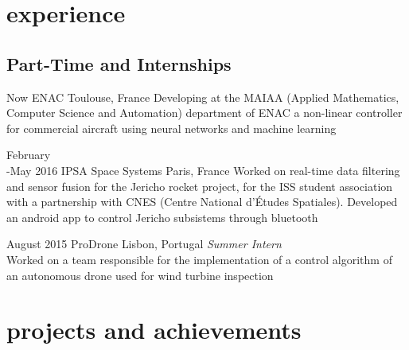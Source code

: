 \documentclass[a4paper]{friggeri-cv} %
\begin{document}

\section{experience}


\subsection{Part-Time and Internships}

\begin{entrylist}





\entry
{Now}
{ENAC}
{Toulouse, France}
{Developing at the MAIAA (Applied Mathematics, Computer Science and Automation) department of ENAC a non-linear controller for commercial aircraft using neural networks and machine learning}

\entry
{February\\-May 2016}
{IPSA Space Systems}
{Paris, France}
{Worked on real-time data filtering and sensor fusion for the Jericho rocket project, for the ISS student association with a partnership with CNES (Centre National d'Études Spatiales). Developed an android app to control Jericho subsistems through bluetooth}

\entry
{August 2015}
{ProDrone}
{Lisbon, Portugal}
{\emph{Summer Intern} \\
Worked on a team responsible for the implementation of a control algorithm of an autonomous drone used for wind turbine inspection}



\end{entrylist}


\section{projects and achievements}
\end{document}
